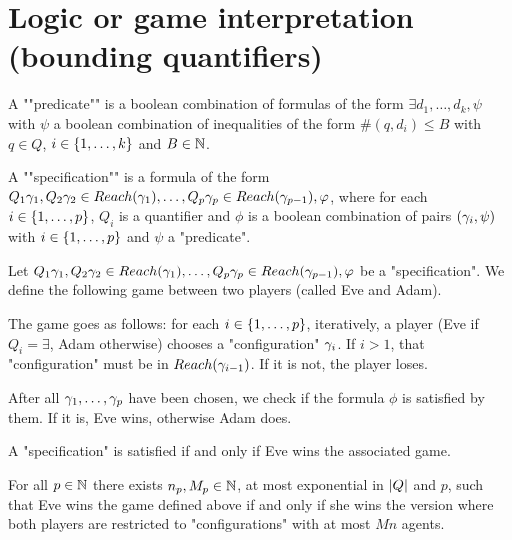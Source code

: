 \section{Logic or game interpretation (bounding quantifiers)}
\label{sec:quantifier-bounds}


\begin{definition}
	A ""predicate"" is a boolean combination of formulas of the form $\exists d_1, \ldots, d_k, \psi$ with $\psi$ a boolean combination of inequalities of the form $\#(q,d_i) \leq B$ with $q\in Q$, $i \in \{1,\dots,k\}$ and $B \in \mathbb{N}$.
	
	A ""specification"" is a formula of the form $Q_1 \gamma_1, Q_2 \gamma_2  \in Reach(\gamma_1), \ldots, Q_p \gamma_p \in Reach(\gamma_{p-1}), \varphi$, where for each $i \in \{1,\dots,p\}$, $Q_i$ is a quantifier and $\phi$ is a boolean combination of pairs $(\gamma_i, \psi)$ with $i \in \{1,\dots,p\}$ and $\psi$ a "predicate".
\end{definition}

\begin{definition}
	Let $Q_1 \gamma_1, Q_2 \gamma_2  \in Reach(\gamma_1), \ldots, Q_p \gamma_p \in Reach(\gamma_{p-1}), \varphi$ be a "specification". We define the following game between two players (called Eve and Adam).
	
	The game goes as follows: for each $i \in \{1,\dots,p\}$, iteratively, a player (Eve if $Q_i = \exists$, Adam otherwise) chooses a "configuration" $\gamma_i$. 
	If $i>1$, that "configuration" must be in $Reach(\gamma_{i-1})$. If it is not, the player loses.
	
	After all $\gamma_1, \ldots, \gamma_p$ have been chosen, we check if the formula $\phi$ is satisfied by them. If it is, Eve wins, otherwise Adam does.
\end{definition}

\begin{lemma}
	A "specification" is satisfied if and only if Eve wins the associated game.
\end{lemma}

\begin{lemma}
	For all $p \in \mathbb{N}$ there exists $n_p, M_p \in \mathbb{N}$, at most exponential in $|Q|$ and $p$,  such that Eve wins the game defined above if and only if she wins the version where both players are restricted to "configurations" with at most $Mn$ agents.
\end{lemma}

